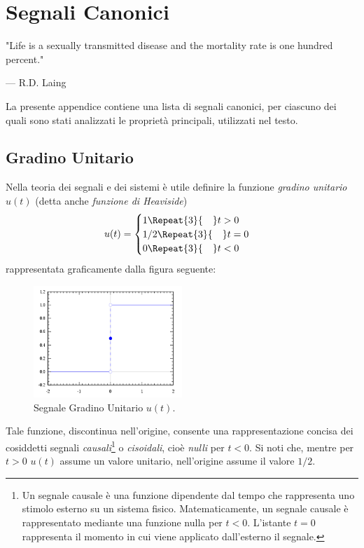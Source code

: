 \documentclass[12pt,oneside,openany]{memoir}
\numberwithin{equation}{subsection}
\newcommand{\quads}[1]{\Repeat{#1}{\quad}}
\begin{document}
\appendix
\chapter{Segnali Canonici}
\epigraph{"Life is a sexually transmitted disease and the mortality rate is one hundred percent."}{--- \textup{R.D. Laing}}
La presente appendice contiene una lista di segnali canonici, per ciascuno dei quali sono stati analizzati le propriet\`a principali, utilizzati nel testo.

\section{Gradino Unitario}
Nella teoria dei segnali e dei sistemi \`e utile definire la funzione \textit{gradino unitario} $u(t)$ (detta anche \textit{funzione di Heaviside})
\begin{equation}
	u(t) =
		\begin{cases}
			1 \quads{3} t > 0\\
			1/2 \quads{3} t = 0\\
			0 \quads{3} t < 0
		\end{cases}
\end{equation}
rappresentata graficamente dalla figura seguente:
\begin{figure}[H]
\centering
\captionsetup{justification=centering}
\includegraphics[width=0.5\textwidth]{images/heaviside_function.png}
\caption{Segnale Gradino Unitario $u(t)$.}
\end{figure}
Tale funzione, discontinua nell'origine, consente una rappresentazione concisa dei cosiddetti segnali \textit{causali}\footnote{Un segnale causale \`e una funzione dipendente dal tempo che rappresenta uno stimolo esterno su un sistema fisico. Matematicamente, un segnale causale \`e rappresentato mediante una funzione nulla per $t < 0$. L'istante $t = 0$ rappresenta il momento in cui viene applicato dall'esterno il segnale.} o \textit{cisoidali}, cio\`e \textit{nulli} per $t < 0$. Si noti che, mentre per $t > 0$ $u(t)$ assume un valore unitario, nell'origine assume il valore $1/2$.
\end{document}
